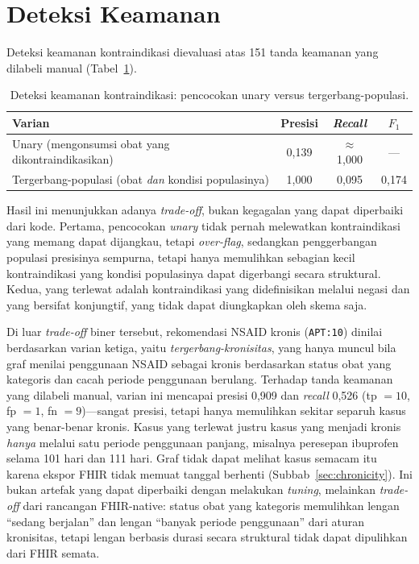 \section{Deteksi Keamanan}
\label{sec:safety-detection}

Deteksi keamanan kontraindikasi dievaluasi atas 151 tanda keamanan yang
dilabeli manual (Tabel~\ref{tab:safety}).

\begin{table}[h]
\centering
\caption{Deteksi keamanan kontraindikasi: pencocokan unary versus tergerbang-populasi.}
\label{tab:safety}
\begin{tabular}{lccc}
\hline
\textbf{Varian} & \textbf{Presisi} & \textbf{\emph{Recall}} & \textbf{$F_1$} \\
\hline
Unary (mengonsumsi obat yang dikontraindikasikan) & 0,139 & $\approx$1,000 & --- \\
Tergerbang-populasi (obat \emph{dan} kondisi populasinya) & 1,000 & 0,095 & 0,174 \\
\hline
\end{tabular}
\end{table}

Hasil ini menunjukkan adanya \emph{trade-off}, bukan kegagalan yang dapat diperbaiki dari kode. Pertama, pencocokan
\emph{unary} tidak pernah melewatkan kontraindikasi yang memang dapat dijangkau, tetapi \emph{over-flag},
sedangkan penggerbangan populasi presisinya sempurna, tetapi hanya memulihkan sebagian kecil
kontraindikasi yang kondisi populasinya dapat digerbangi secara struktural. Kedua, yang terlewat
adalah kontraindikasi yang didefinisikan melalui negasi dan yang bersifat konjungtif, yang
tidak dapat diungkapkan oleh skema saja.

Di luar \emph{trade-off} biner tersebut, rekomendasi NSAID kronis (\texttt{APT:10}) dinilai berdasarkan
varian ketiga, yaitu \emph{tergerbang-kronisitas}, yang hanya muncul bila graf menilai
penggunaan NSAID sebagai kronis berdasarkan status obat yang kategoris dan cacah periode penggunaan
berulang. Terhadap tanda keamanan yang dilabeli manual, varian ini mencapai presisi
0,909 dan \emph{recall} 0,526 (tp $=10$, fp $=1$,
fn $=9$)---sangat presisi, tetapi hanya memulihkan sekitar separuh kasus yang benar-benar
kronis. Kasus yang terlewat justru kasus yang menjadi kronis \emph{hanya} melalui satu periode
penggunaan panjang, misalnya peresepan ibuprofen selama 101 hari dan 111 hari. Graf tidak
dapat melihat kasus semacam itu karena ekspor FHIR tidak memuat tanggal berhenti
(Subbab~\ref{sec:chronicity}). Ini bukan artefak yang dapat diperbaiki dengan melakukan 
\emph{tuning}, melainkan \emph{trade-off}
dari rancangan FHIR-native: status obat yang kategoris memulihkan lengan ``sedang berjalan''
dan lengan ``banyak periode penggunaan'' dari aturan kronisitas, tetapi lengan berbasis durasi secara
struktural tidak dapat dipulihkan dari FHIR semata.

